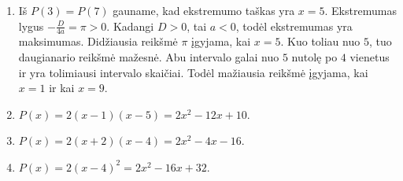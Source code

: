 \documentclass[11pt,a4paper]{article}
\begin{document}
\begin{enumerate}[label=\textbf{\arabic*.},leftmargin=2.6em,itemsep=0.85em,topsep=0.55em]
\item Iš $P(3)=P(7)$ gauname, kad ekstremumo taškas yra $x=5$. Ekstremumas lygus $-\frac{D}{4a}=\pi>0$. Kadangi $D>0$, tai $a<0$, todėl ekstremumas yra maksimumas. Didžiausia reikšmė $\pi$ įgyjama, kai $x=5$. Kuo toliau nuo $5$, tuo daugianario reikšmė mažesnė. Abu intervalo galai nuo $5$ nutolę po $4$ vienetus ir yra tolimiausi intervalo skaičiai. Todėl mažiausia reikšmė įgyjama, kai $x=1$ ir kai $x=9$.

\item $P(x)=2(x-1)(x-5)=\boxed{2x^2-12x+10}$.

\item $P(x)=2(x+2)(x-4)=\boxed{2x^2-4x-16}$.

\item $P(x)=2(x-4)^2=\boxed{2x^2-16x+32}$.
\end{enumerate}
\end{document}
